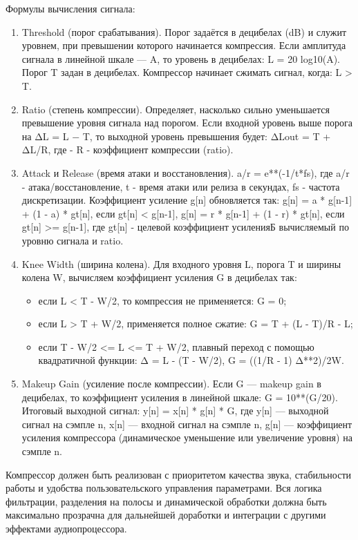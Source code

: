 Формулы вычисления сигнала:
\begin{enumerate}
	\item Threshold (порог срабатывания). Порог задаётся в децибелах (dB) и служит уровнем, при превышении которого начинается компрессия. Если амплитуда сигнала в линейной шкале — A, то уровень в децибелах: L = 20 log10(A). Порог T задан в децибелах. Компрессор начинает сжимать сигнал, когда:	L > T.
	\item Ratio (степень компрессии). Определяет, насколько сильно уменьшается превышение уровня сигнала над порогом. Если входной уровень выше порога на ΔL = L − T, то выходной уровень превышения будет: ΔLout = T + ΔL/R, где - R - коэффициент компрессии (ratio).
	\item Attack и Release (время атаки и восстановления). a/r = e**(-1/t*fs), где a/r - атака/восстановление, t - время атаки или релиза в секундах, fs - частота дискретизации. Коэффициент усиление g[n] обновляется так: g[n] = a * g[n-1] + (1 - a) * gt[n], если gt[n] < g[n-1], g[n] = r * g[n-1] + (1 - r) * gt[n], если gt[n] >= g[n-1], где gt[n] - целевой коэффициент усиленияБ вычисляемый по уровню сигнала и ratio.
	\item Knee Width (ширина колена). Для входного уровня L, порога T и ширины колена W, вычисляем коэффициент усиления G в децибелах так:
	\begin{itemize}
		\item если L < T - W/2, то компрессия не применяется: G = 0;
		\item если L > T + W/2, применяется полное сжатие: G = T + (L - T)/R - L;
		\item если T - W/2 <= L <= T + W/2, плавный переход с помощью квадратичной функции: Δ = L - (T - W/2), G = ((1/R - 1) Δ**2)/2W.
	\end{itemize}
	\item Makeup Gain (усиление после компрессии). Если G — makeup gain в децибелах, то коэффициент усиления в линейной шкале: G = 10**(G/20). Итоговый выходной сигнал: y[n] = x[n] * g[n] * G, где y[n] — выходной сигнал на сэмпле n, x[n] — входной сигнал на сэмпле n, g[n] — коэффициент усиления компрессора (динамическое уменьшение или увеличение уровня) на сэмпле n.
\end{enumerate}

Компрессор должен быть реализован с приоритетом качества звука, стабильности работы и удобства пользовательского управления параметрами. Вся логика фильтрации, разделения на полосы и динамической обработки должна быть максимально прозрачна для дальнейшей доработки и интеграции с другими эффектами аудиопроцессора.

